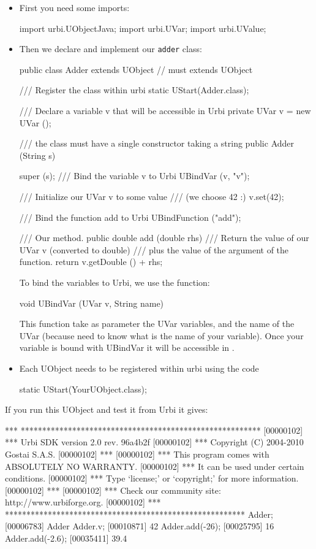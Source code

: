 \begin{itemize}
\item First you need some imports:

\begin{java}
import urbi.UObjectJava;
import urbi.UVar;
import urbi.UValue;
\end{java}

\item Then we declare and implement our \lstinline{adder} class:
\begin{java}
public class Adder extends UObject // must extends UObject
{
  /// Register the class within urbi
  static { UStart(Adder.class); }

  /// Declare a variable v that will be accessible in Urbi
  private UVar v = new UVar ();

  /// the class must have a single constructor taking a string
  public Adder (String s)
  {
    super (s);
    /// Bind the variable v to Urbi
    UBindVar (v, "v");

    /// Initialize our UVar v to some value
    /// (we choose 42 :)
    v.set(42);

    /// Bind the function add to Urbi
    UBindFunction ("add");
  }

  /// Our method.
  public double add (double rhs)
  {
    /// Return the value of our UVar v (converted to double)
    /// plus the value of the argument of the function.
    return v.getDouble () + rhs;
  }
}
\end{java}

To bind the variables to Urbi, we use the function:
\begin{java}
void UBindVar (UVar v, String name)
\end{java}

This function take as parameter the UVar variables, and the name of the
UVar (because \urbi need to know what is the name of your variable).
Once your variable is bound with UBindVar it will be accessible in \urbi.

\item Each UObject needs to be registered within urbi using the code
\begin{java}
static { UStart(YourUObject.class); }
\end{java}
\end{itemize}

If you run this UObject and test it from Urbi it gives:

\begin{urbiunchecked}
[00000102] *** ********************************************************
[00000102] *** Urbi SDK version 2.0 rev. 96a4b2f
[00000102] *** Copyright (C) 2004-2010 Gostai S.A.S.
[00000102] ***
[00000102] *** This program comes with ABSOLUTELY NO WARRANTY.
[00000102] *** It can be used under certain conditions.
[00000102] *** Type `license;' or `copyright;' for more information.
[00000102] ***
[00000102] *** Check our community site: http://www.urbiforge.org.
[00000102] *** ********************************************************
Adder;
[00006783] Adder
Adder.v;
[00010871] 42
Adder.add(-26);
[00025795] 16
Adder.add(-2.6);
[00035411] 39.4
\end{urbiunchecked}

